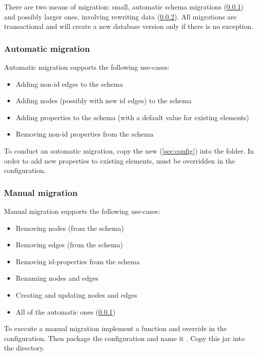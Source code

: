 There are two means of migration: small, automatic schema migrations (\cref{sec:autoMigration}) and possibly larger ones, involving rewriting data (\cref{sec:manualMigration}). All migrations are transactional and will create a new database version only if there is no exception.

\subsubsection{Automatic migration}\label{sec:autoMigration}
Automatic migration supports the following use-cases:
\begin{itemize}
\item Adding non-id edges to the schema
\item Adding nodes (possibly with new id edges) to the schema
\item Adding properties to the schema (with a default value for existing elements)
\item Removing non-id properties from the schema
\end{itemize}

To conduct an automatic migration, copy the new  (\cref{sec:config}) into the  folder. In order to add new properties to existing elements,  must be overridden in the configuration.

\subsubsection{Manual migration}\label{sec:manualMigration}
Manual migration supports the following use-cases:
\begin{itemize}
\item Removing nodes (from the schema)
\item Removing edges (from the schema)
\item Removing id-properties from the schema
\item Renaming nodes and edges
\item Creating and updating nodes and edges
\item All of the automatic ones (\cref{sec:autoMigration})
\end{itemize}

To execute a manual migration implement a function  and override  in the configuration. Then package the configuration and name it . Copy this jar into the  directory.

